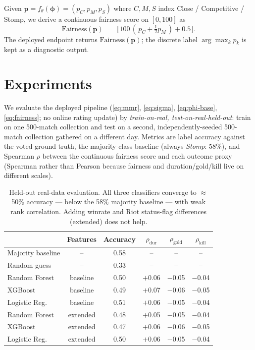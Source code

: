 \documentclass{article}
\begin{document}
Given $\mathbf{p} = f_\theta(\boldsymbol{\phi}) = (p_C, p_M, p_S)$ where
$C, M, S$ index Close / Competitive / Stomp, we derive a continuous
fairness score on $[0, 100]$ as
\begin{equation}
\mathrm{Fairness}(\mathbf{p}) \;=\;
\big\lfloor 100\,(\,p_C + \tfrac{1}{2} p_M\,) + 0.5 \big\rfloor.
\label{eq:fairness}
\end{equation}
The deployed endpoint returns $\mathrm{Fairness}(\mathbf{p})$; the
discrete label $\arg\max_k p_k$ is kept as a diagnostic output.

\section{Experiments}
\label{sec:exp}

We evaluate the deployed pipeline
(\eqref{eq:mmr}, \eqref{eq:sigma}, \eqref{eq:phi-base}, \eqref{eq:fairness};
no online rating update) by \emph{train-on-real, test-on-real-held-out}:
train on one 500-match collection and test on a second,
independently-seeded 500-match collection gathered on a different day.
Metrics are label accuracy against the voted ground truth, the
majority-class baseline (always-\emph{Stomp}: 58\%), and Spearman $\rho$
between the continuous fairness score and each outcome proxy (Spearman
rather than Pearson because fairness and duration/gold/kill live on
different scales).

\begin{table}[t]
\caption{Held-out real-data evaluation. All three classifiers converge to
$\approx$50\% accuracy --- below the 58\% majority baseline --- with weak
rank correlation. Adding winrate and Riot status-flag differences (extended)
does not help.}
\label{tab:results}
\begin{center}
\small
\begin{tabular}{lccccc}
\toprule
 & \textbf{Features} & \textbf{Accuracy} & $\rho_{\text{dur}}$ & $\rho_{\text{gold}}$ & $\rho_{\text{kill}}$ \\
\midrule
Majority baseline & --       & 0.58 & --     & --     & --     \\
Random guess      & --       & 0.33 & --     & --     & --     \\
\midrule
Random Forest     & baseline & 0.50 & $+$0.06 & $-$0.05 & $-$0.04 \\
XGBoost           & baseline & 0.49 & $+$0.07 & $-$0.06 & $-$0.05 \\
Logistic Reg.     & baseline & 0.51 & $+$0.06 & $-$0.05 & $-$0.04 \\
\midrule
Random Forest     & extended & 0.48 & $+$0.05 & $-$0.05 & $-$0.04 \\
XGBoost           & extended & 0.47 & $+$0.06 & $-$0.06 & $-$0.05 \\
Logistic Reg.     & extended & 0.50 & $+$0.06 & $-$0.05 & $-$0.04 \\
\bottomrule
\end{tabular}
\end{center}
\end{table}
\end{document}
